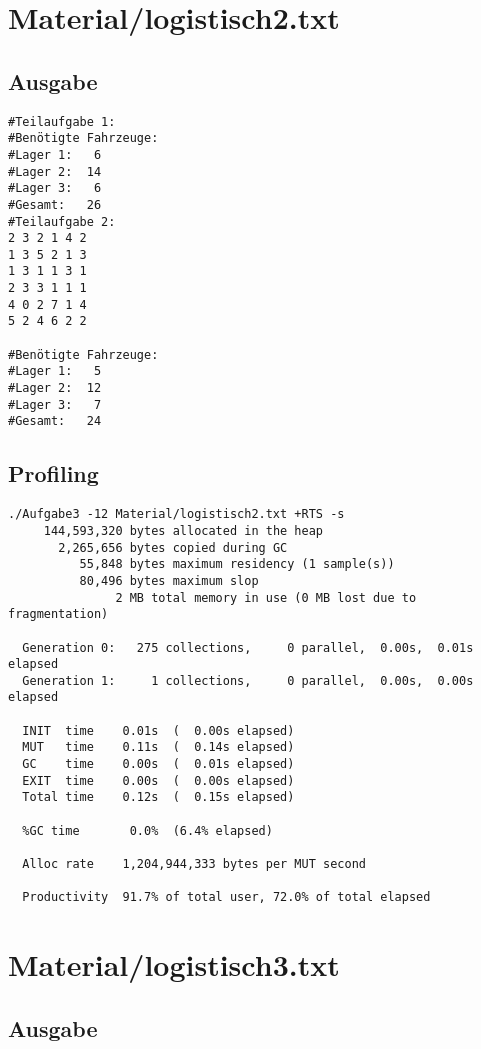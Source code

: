 \documentclass{scrreprt}
\begin{document}
\section{Material/logistisch2.txt}

\subsection*{Ausgabe}

\begin{verbatim}
#Teilaufgabe 1:
#Benötigte Fahrzeuge:
#Lager 1:   6
#Lager 2:  14
#Lager 3:   6
#Gesamt:   26
#Teilaufgabe 2:
2 3 2 1 4 2
1 3 5 2 1 3
1 3 1 1 3 1
2 3 3 1 1 1
4 0 2 7 1 4
5 2 4 6 2 2

#Benötigte Fahrzeuge:
#Lager 1:   5
#Lager 2:  12
#Lager 3:   7
#Gesamt:   24
\end{verbatim}

\subsection*{Profiling}

\begin{verbatim}
./Aufgabe3 -12 Material/logistisch2.txt +RTS -s 
     144,593,320 bytes allocated in the heap
       2,265,656 bytes copied during GC
          55,848 bytes maximum residency (1 sample(s))
          80,496 bytes maximum slop
               2 MB total memory in use (0 MB lost due to fragmentation)

  Generation 0:   275 collections,     0 parallel,  0.00s,  0.01s elapsed
  Generation 1:     1 collections,     0 parallel,  0.00s,  0.00s elapsed

  INIT  time    0.01s  (  0.00s elapsed)
  MUT   time    0.11s  (  0.14s elapsed)
  GC    time    0.00s  (  0.01s elapsed)
  EXIT  time    0.00s  (  0.00s elapsed)
  Total time    0.12s  (  0.15s elapsed)

  %GC time       0.0%  (6.4% elapsed)

  Alloc rate    1,204,944,333 bytes per MUT second

  Productivity  91.7% of total user, 72.0% of total elapsed
\end{verbatim}

\section{Material/logistisch3.txt}

\subsection*{Ausgabe}
\end{document}
